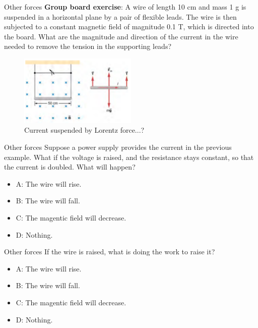 \documentclass{beamer}
\begin{document}
\begin{frame}{Other forces}
\small
\textbf{Group board exercise}: A wire of length 10 cm and mass 1 g is suspended in a horizontal plane by a pair of flexible leads.  The wire is then subjected to a constant magnetic field of magnitude 0.1 T, which is directed into the board.  What are the magnitude and direction of the current in the wire needed to remove the tension in the supporting leads?
\begin{figure}
\centering
\includegraphics[width=0.5\textwidth]{figures/leads.png}
\caption{\label{fig:leads} Current suspended by Lorentz force...?}
\end{figure}
\end{frame}

\begin{frame}{Other forces}
Suppose a power supply provides the current in the previous example.  What if the voltage is raised, and the resistance stays constant, so that the current is doubled.  What will happen?
\begin{itemize}
\item A: The wire will rise.
\item B: The wire will fall.
\item C: The magentic field will decrease.
\item D: Nothing.
\end{itemize}
\end{frame}

\begin{frame}{Other forces}
If the wire is raised, what is doing the work to raise it?
\begin{itemize}
\item A: The wire will rise.
\item B: The wire will fall.
\item C: The magentic field will decrease.
\item D: Nothing.
\end{itemize}
\end{frame}
\end{document}
